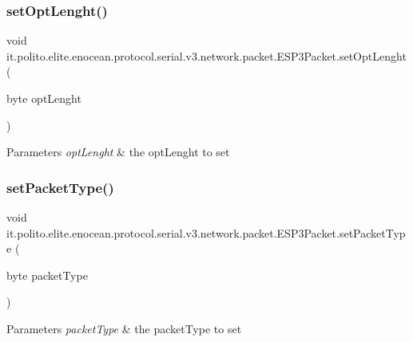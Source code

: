 \subsubsection{\texorpdfstring{set\+Opt\+Lenght()}{setOptLenght()}}
{\footnotesize\ttfamily void it.\+polito.\+elite.\+enocean.\+protocol.\+serial.\+v3.\+network.\+packet.\+E\+S\+P3\+Packet.\+set\+Opt\+Lenght (\begin{DoxyParamCaption}\item[{byte}]{opt\+Lenght }\end{DoxyParamCaption})}


\begin{DoxyParams}{Parameters}
{\em opt\+Lenght} & the opt\+Lenght to set \\
\hline
\end{DoxyParams}
\hypertarget{classit_1_1polito_1_1elite_1_1enocean_1_1protocol_1_1serial_1_1v3_1_1network_1_1packet_1_1_e_s_p3_packet_a2cd675c5c2854c5cd7f8ee9d17f46fec}{}\label{classit_1_1polito_1_1elite_1_1enocean_1_1protocol_1_1serial_1_1v3_1_1network_1_1packet_1_1_e_s_p3_packet_a2cd675c5c2854c5cd7f8ee9d17f46fec} 
\subsubsection{\texorpdfstring{set\+Packet\+Type()}{setPacketType()}}
{\footnotesize\ttfamily void it.\+polito.\+elite.\+enocean.\+protocol.\+serial.\+v3.\+network.\+packet.\+E\+S\+P3\+Packet.\+set\+Packet\+Type (\begin{DoxyParamCaption}\item[{byte}]{packet\+Type }\end{DoxyParamCaption})}


\begin{DoxyParams}{Parameters}
{\em packet\+Type} & the packet\+Type to set \\
\hline
\end{DoxyParams}
\hypertarget{classit_1_1polito_1_1elite_1_1enocean_1_1protocol_1_1serial_1_1v3_1_1network_1_1packet_1_1_e_s_p3_packet_a9be66e805a0bf3313816e30ed027f076}{}\label{classit_1_1polito_1_1elite_1_1enocean_1_1protocol_1_1serial_1_1v3_1_1network_1_1packet_1_1_e_s_p3_packet_a9be66e805a0bf3313816e30ed027f076} 
